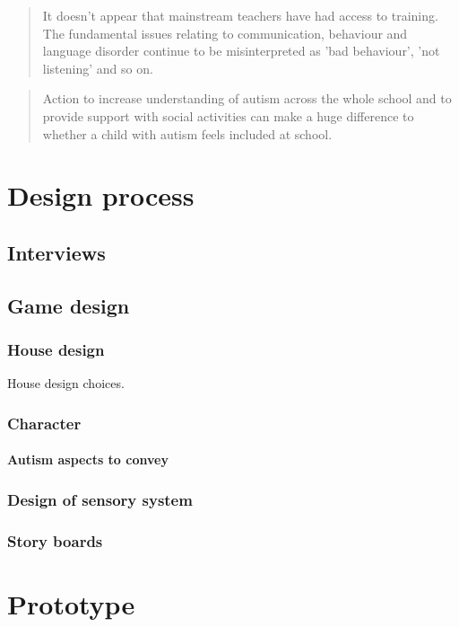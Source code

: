 \documentclass[11pt]{report}
\begin{document}
\begin{quote}
It doesn't appear that mainstream teachers have had access to training. The fundamental issues relating to communication, behaviour and language disorder continue to be misinterpreted as 'bad behaviour', 'not listening' and so on.\cite{nasschool}
\end{quote}


\begin{quote}
Action to increase understanding of autism across the whole school and to provide support with social activities can make a huge difference to whether a child with autism feels included at school.\cite{nasschool}
\end{quote}



\chapter{Design process}
\section{Interviews}

\section{Game design}
\subsection{House design}
House design choices. 
\subsection{Character}
\subsubsection{Autism aspects to convey}
\subsection{Design of sensory system}
\subsection{Story boards}

\chapter{Prototype}
\end{document}
